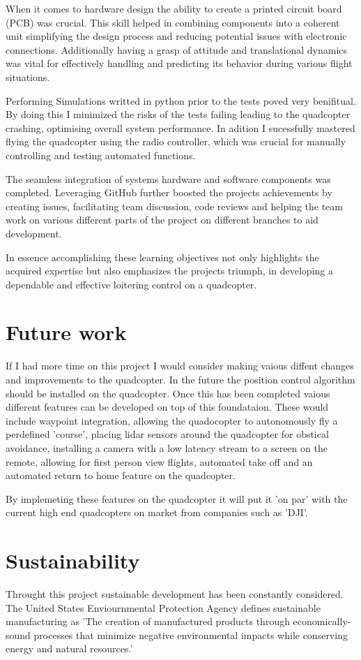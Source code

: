 \documentclass{report}
\begin{document}
When it comes to hardware design the ability to create a printed circuit board
(PCB) was crucial. This skill helped in combining components into a coherent
unit simplifying the design process and reducing potential issues with
electronic connections. Additionally having a grasp of attitude and
translational dynamics was vital for effectively handling and predicting its
behavior during various flight situations.

Performing Simulations writted in python prior to the tests poved very
benifitual. By doing this I minimized the risks of the tests failing leading to
the quadcopter crashing, optimising overall system performance. In adition I
sucessfully mastered flying the quadcopter using the radio controller, which was
crucial for manually controlling and testing automated functions.

The seamless integration of systems hardware and software components was
completed. Leveraging GitHub further boosted the projects achievements by
creating issues, facilitating team discussion, code reviews and helping the team
work on various different parts of the project on different branches to aid
development.

In essence accomplishing these learning objectives not only highlights the
acquired expertise but also emphasizes the projects triumph, in developing a
dependable and effective loitering control on a quadcopter.

\section{Future work}
If I had more time on this project I would consider making vaious diffent changes and improvements to the quadcopter. In the future the position control algorithm should be installed on the quadcopter. Once this has been completed vaious different features can be developed on top of this foundataion. These would include waypoint integration, allowing the quadocopter to autonomously fly a perdefined 'course', placing lidar sensors around the quadcopter for obstical avoidance, installing a camera with a low latency stream to a screen on the remote, allowing for first person view flights, automated take off and an automated return to home feature on the quadcopter. 

By implemeting these features on the quadcopter it will put it 'on par' with the current high end quadcopters on market from companies such as 'DJI'.

\section{Sustainability}
Throught this project sustainable development has been constantly considered. The United States Enviournmental Protection Agency defines sustainable manufacturing as 'The creation of manufactured products through economically-sound processes that minimize negative environmental impacts while conserving energy and natural resources.'\cite{sustainability}
\end{document}
